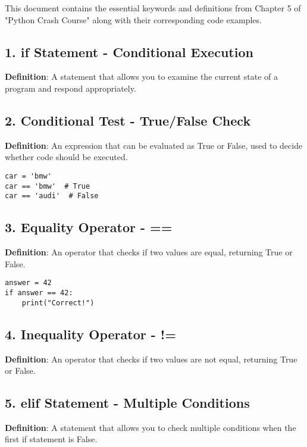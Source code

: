 
This document contains the essential keywords and definitions from Chapter 5 of "Python Crash Course" along with their corresponding code examples.

\subsection*{1. if Statement - Conditional Execution}
\textbf{Definition}: A statement that allows you to examine the current state of a program and respond appropriately.



\subsection*{2. Conditional Test - True/False Check}
\textbf{Definition}: An expression that can be evaluated as True or False, used to decide whether code should be executed.

\begin{lstlisting}
car = 'bmw'
car == 'bmw'  # True
car == 'audi'  # False
\end{lstlisting}

\subsection*{3. Equality Operator - ==}
\textbf{Definition}: An operator that checks if two values are equal, returning True or False.

\begin{lstlisting}
answer = 42
if answer == 42:
    print("Correct!")
\end{lstlisting}

\subsection*{4. Inequality Operator - !=}
\textbf{Definition}: An operator that checks if two values are not equal, returning True or False.



\subsection*{5. elif Statement - Multiple Conditions}
\textbf{Definition}: A statement that allows you to check multiple conditions when the first if statement is False.

